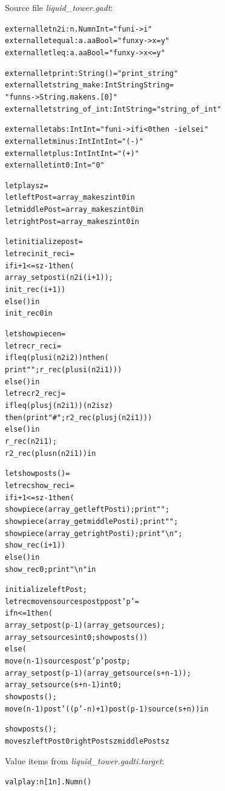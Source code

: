 \documentclass{article}
\newcommand{\tmem}[1]{{\em #1\/}}
\newenvironment{tmcode}[1][]{\begin{alltt}}{\end{alltt}}
\begin{document}
Source file {\tmem{liquid\_tower.gadt}}:
\begin{tmcode}
external let n2i : n. Num n  Int = "fun i -> i"
external let equal : a. a  a  Bool = "fun x y -> x = y"
external let leq : a. a  a  Bool = "fun x y -> x <= y"

external let print : String  () = "print_string"
external let string_make : Int  String  String =
  "fun n s -> String.make n s.[0]"
external let string_of_int : Int  String = "string_of_int"

external let abs : Int  Int = "fun i -> if i < 0 then ~-i else i"
external let minus : Int  Int  Int = "(-)"
external let plus : Int  Int  Int = "(+)"
external let int0 : Int = "0"

let play sz =
  let leftPost = array_make sz int0 in
  let middlePost = array_make sz int0 in
  let rightPost = array_make sz int0 in

  let initialize post =
    let rec init_rec i =
      if i + 1 <= sz - 1 then (
        array_set post i (n2i (i+1));
        init_rec (i+1))
      else () in
    init_rec 0 in

  let showpiece n =
    let rec r_rec i =
      if leq (plus i (n2i 2)) n then (
        print " "; r_rec (plus i (n2i 1)))
      else () in
    let rec r2_rec j =
      if leq (plus j (n2i 1)) (n2i sz)
      then (print "#"; r2_rec (plus j (n2i 1)))
      else () in
    r_rec (n2i 1);
    r2_rec (plus n (n2i 1)) in

  let showposts () =
    let rec show_rec i =
      if i + 1 <= sz - 1 then (
        showpiece (array_get leftPost i); print " ";
        showpiece (array_get middlePost i); print " ";
        showpiece (array_get rightPost i); print "\textbackslash n";
        show_rec (i+1))
      else () in
    show_rec 0; print "\textbackslash n" in

  initialize leftPost;
  let rec move n source s post p post' p' =
    if n <= 1 then (
      array_set post (p - 1) (array_get source s);
      array_set source s int0; showposts ())
    else (
      move (n - 1) source s post' p' post p;
      array_set post (p - 1) (array_get source (s + n - 1));
      array_set source (s + n - 1) int0;
      showposts ();
      move (n - 1) post' ((p' - n) + 1) post (p - 1) source (s + n)) in

  showposts ();
  move sz leftPost 0 rightPost sz middlePost sz
\end{tmcode}
Value items from {\tmem{liquid\_tower.gadti.target}}:
\begin{tmcode}
val play : n[1  n]. Num n  ()
\end{tmcode}
\end{document}
